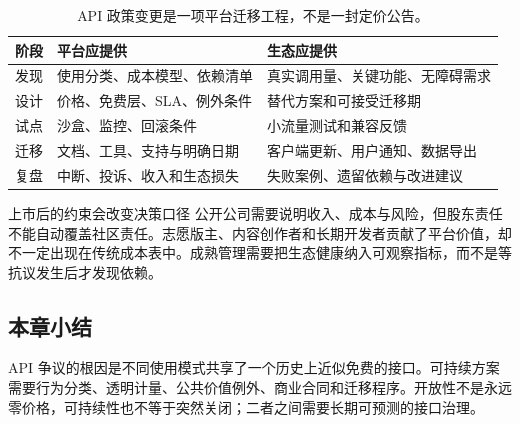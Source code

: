 \begin{table}[H]
\centering
\begin{tabular}{L{0.2\textwidth}L{0.34\textwidth}L{0.36\textwidth}}
\toprule
阶段 & 平台应提供 & 生态应提供 \\
\midrule
发现 & 使用分类、成本模型、依赖清单 & 真实调用量、关键功能、无障碍需求 \\
设计 & 价格、免费层、SLA、例外条件 & 替代方案和可接受迁移期 \\
试点 & 沙盒、监控、回滚条件 & 小流量测试和兼容反馈 \\
迁移 & 文档、工具、支持与明确日期 & 客户端更新、用户通知、数据导出 \\
复盘 & 中断、投诉、收入和生态损失 & 失败案例、遗留依赖与改进建议 \\
\bottomrule
\end{tabular}
\caption{API 政策变更是一项平台迁移工程，不是一封定价公告。}
\end{table}

\begin{warningbox}{上市后的约束会改变决策口径}
公开公司需要说明收入、成本与风险，但股东责任不能自动覆盖社区责任。志愿版主、内容创作者和长期开发者贡献了平台价值，却不一定出现在传统成本表中。成熟管理需要把生态健康纳入可观察指标，而不是等抗议发生后才发现依赖。
\end{warningbox}

\subsection{本章小结}

API 争议的根因是不同使用模式共享了一个历史上近似免费的接口。可持续方案需要行为分类、透明计量、公共价值例外、商业合同和迁移程序。开放性不是永远零价格，可持续性也不等于突然关闭；二者之间需要长期可预测的接口治理。

